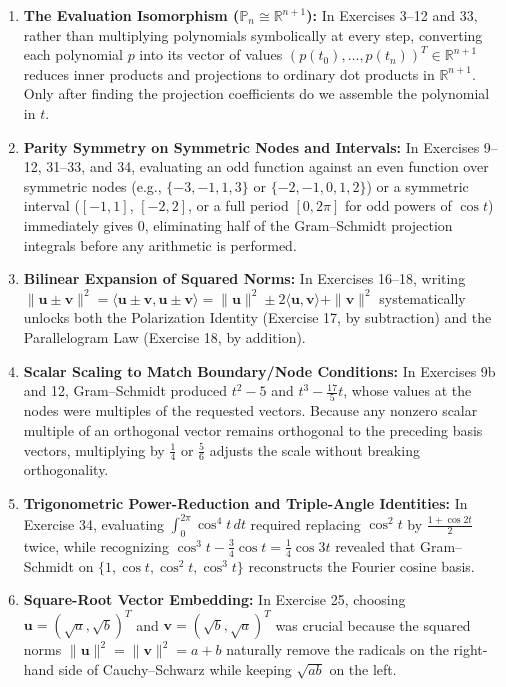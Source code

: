 \documentclass[11pt, letterpaper]{article}
\theoremstyle{definition}
\theoremstyle{remark}
\begin{document}
\begin{enumerate}
    \item \textbf{The Evaluation Isomorphism ($\mathbb{P}_n \cong \mathbb{R}^{n+1}$):} In Exercises 3--12 and 33, rather than multiplying polynomials symbolically at every step, converting each polynomial $p$ into its vector of values $(p(t_0), \dots, p(t_n))^T \in \mathbb{R}^{n+1}$ reduces inner products and projections to ordinary dot products in $\mathbb{R}^{n+1}$. Only after finding the projection coefficients do we assemble the polynomial in $t$.
    \item \textbf{Parity Symmetry on Symmetric Nodes and Intervals:} In Exercises 9--12, 31--33, and 34, evaluating an odd function against an even function over symmetric nodes (e.g., $\{-3, -1, 1, 3\}$ or $\{-2, -1, 0, 1, 2\}$) or a symmetric interval ($[-1, 1]$, $[-2, 2]$, or a full period $[0, 2\pi]$ for odd powers of $\cos t$) immediately gives $0$, eliminating half of the Gram--Schmidt projection integrals before any arithmetic is performed.
    \item \textbf{Bilinear Expansion of Squared Norms:} In Exercises 16--18, writing $\|\mathbf{u} \pm \mathbf{v}\|^2 = \langle \mathbf{u} \pm \mathbf{v}, \mathbf{u} \pm \mathbf{v} \rangle = \|\mathbf{u}\|^2 \pm 2\langle \mathbf{u}, \mathbf{v} \rangle + \|\mathbf{v}\|^2$ systematically unlocks both the Polarization Identity (Exercise 17, by subtraction) and the Parallelogram Law (Exercise 18, by addition).
    \item \textbf{Scalar Scaling to Match Boundary/Node Conditions:} In Exercises 9b and 12, Gram--Schmidt produced $t^2 - 5$ and $t^3 - \frac{17}{5}t$, whose values at the nodes were multiples of the requested vectors. Because any nonzero scalar multiple of an orthogonal vector remains orthogonal to the preceding basis vectors, multiplying by $\frac{1}{4}$ or $\frac{5}{6}$ adjusts the scale without breaking orthogonality.
    \item \textbf{Trigonometric Power-Reduction and Triple-Angle Identities:} In Exercise 34, evaluating $\int_0^{2\pi} \cos^4 t\,dt$ required replacing $\cos^2 t$ by $\frac{1+\cos 2t}{2}$ twice, while recognizing $\cos^3 t - \frac{3}{4}\cos t = \frac{1}{4}\cos 3t$ revealed that Gram--Schmidt on $\{1, \cos t, \cos^2 t, \cos^3 t\}$ reconstructs the Fourier cosine basis.
    \item \textbf{Square-Root Vector Embedding:} In Exercise 25, choosing $\mathbf{u} = (\sqrt{a}, \sqrt{b})^T$ and $\mathbf{v} = (\sqrt{b}, \sqrt{a})^T$ was crucial because the squared norms $\|\mathbf{u}\|^2 = \|\mathbf{v}\|^2 = a+b$ naturally remove the radicals on the right-hand side of Cauchy--Schwarz while keeping $\sqrt{ab}$ on the left.
\end{enumerate}
\end{document}
